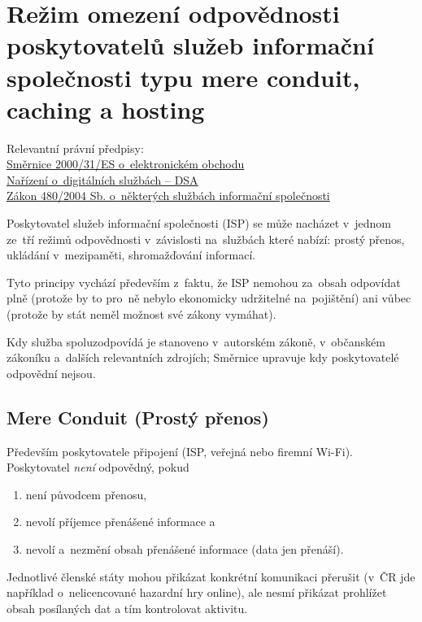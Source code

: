 \section{Režim omezení odpovědnosti poskytovatelů služeb informační společnosti typu mere conduit, caching a hosting}

{}Relevantní právní předpisy:
\\\href{https://eur-lex.europa.eu/legal-content/CS/TXT/?uri=CELEX%
}{Směrnice 2000/31/ES o~elektronickém obchodu}
\\\href{https://eur-lex.europa.eu/legal-content/CS/TXT/?uri=celex%3A32022R2065}{Nařízení o~digitálních službách -- DSA}
\\\href{https://www.zakonyprolidi.cz/cs/2004-480}{Zákon 480/2004 Sb. o~některých službách informační společnosti}

Poskytovatel služeb informační společnosti (ISP) se může nacházet v~jednom ze~tří režimů odpovědnosti v~závislosti na~službách které nabízí: prostý přenos, ukládání v~mezipaměti, shromažďování informací.

Tyto principy vychází především z~faktu, že ISP nemohou za~obsah odpovídat plně (protože by to pro~ně nebylo ekonomicky udržitelné na~pojištění) ani vůbec (protože by stát neměl možnost své zákony vymáhat).

Kdy služba spoluzodpovídá je stanoveno v~autorském zákoně, v~občanském zákoníku a~dalších relevantních zdrojích; Směrnice upravuje kdy poskytovatelé odpovědní nejsou.


\subsection{Mere Conduit (Prostý přenos)}

Především poskytovatele připojení (ISP, veřejná nebo firemní Wi-Fi).
Poskytovatel \emph{není} odpovědný, pokud
\begin{enumerate}[label=\alph*)]
\item není původcem přenosu,
\item nevolí příjemce přenášené informace a
\item nevolí a~nezmění obsah přenášené informace (data jen přenáší).
\end{enumerate}

Jednotlivé členské státy mohou přikázat konkrétní komunikaci přerušit (v~ČR jde například o~nelicencované hazardní hry online), ale nesmí přikázat prohlížet obsah posílaných dat a tím kontrolovat aktivitu.

